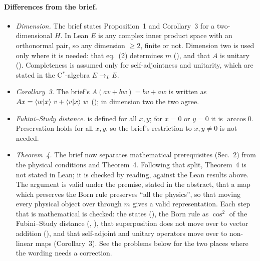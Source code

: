 \documentclass[11pt]{article}
\begin{document}
\paragraph{Differences from the brief.}
\begin{itemize}
\item \emph{Dimension.} The brief states Proposition~1 and Corollary~3 for a two-dimensional
  $H$. In Lean $E$ is any complex inner product space with an orthonormal pair, so any
  dimension $\ge 2$, finite or not. Dimension two is used only where it is needed: that
  eq.~(2) determines $m$ (), and that $A$ is unitary
  (). Completeness is assumed only for self-adjointness and
  unitarity, which are stated in the C$^*$-algebra $E \to_L E$.
\item \emph{Corollary~3.} The brief's $A(av + bw) = bv + aw$ is written as
  $A x = \braket{w|x}\,v + \braket{v|x}\,w$ (); in dimension two the two agree.
\item \emph{Fubini--Study distance.}  is defined for all $x, y$; for $x = 0$ or
  $y = 0$ it is $\arccos 0$. Preservation holds for all $x, y$, so the brief's restriction to
  $x, y \ne 0$ is not needed.
\item \emph{Theorem~4.} The brief now separates mathematical prerequisites (Sec.~2) from the
  physical conditions and Theorem~4. Following that split, Theorem~4 is not stated in Lean; it
  is checked by reading, against the Lean results above. The argument is valid under the
  premise, stated in the abstract, that a map which preserves the Born rule preserves ``all
  the physics'', so that moving every physical object over through $m$ gives a valid
  representation. Each step that is mathematical is checked: the states (),
  the Born rule as $\cos^2$ of the Fubini--Study distance (,
  ), that superposition does not move over to vector addition
  (), and that self-adjoint and unitary operators move over to non-linear
  maps (Corollary~3). See the problems below for the two places where the wording needs a
  correction.
\end{itemize}
\end{document}
